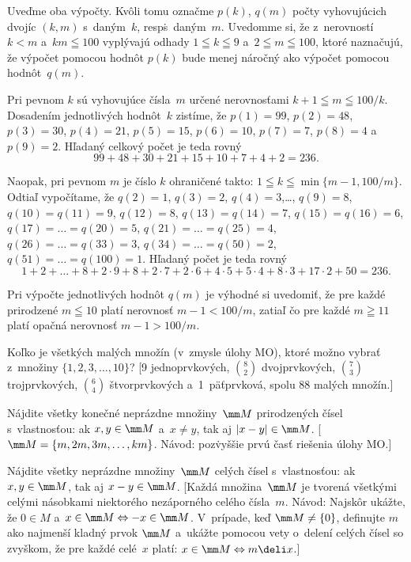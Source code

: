 {Uveďme oba výpočty. Kvôli tomu označme $p(k)$, $q(m)$ počty
vyhovujúcich dvojíc $(k,m)$ s~daným~$k$, resp\. s~daným~$m$.
Uvedomme si, že z~nerovností $k<m$ a~$km\leqq100$ vyplývajú odhady
$1\leqq k\leqq 9$ a~$2\leqq m\leqq 100$, ktoré naznačujú, že
výpočet pomocou hodnôt $p(k)$ bude menej náročný ako výpočet pomocou
hodnôt~$q(m)$.

Pri pevnom $k$ sú vyhovujúce čísla~$m$ určené nerovnosťami $k+1\leqq
m\leqq 100/k$. Dosadením jednotlivých hodnôt~$k$
zistíme, že $p(1)=99$, $p(2)=48$, $p(3)=30$, $p(4)=21$, $p(5)=15$,
$p(6)=10$, $p(7)=7$, $p(8)=4$ a~$p(9)=2$.
Hľadaný celkový počet je teda rovný
$$
99+48+30+21+15+10+7+4+2=236.
$$

Naopak, pri pevnom $m$ je číslo $k$ ohraničené takto:
$1\leqq k\leqq\min\{m-1,100/m\}$. Odtiaľ vypočítame,
že $q(2)=1$, $q(3)=2$, $q(4)=3$,\dots, $q(9)=8$,
$q(10)=q(11)=9$, $q(12)=8$, $q(13)=q(14)=7$,
$q(15)=q(16)=6$, $q(17)=\dots=q(20)=5$,
$q(21)=\dots=q(25)=4$, $q(26)=\dots=q(33)=3$,
$q(34)=\dots=q(50)=2$, $q(51)=\dots=q(100)=1$. Hľadaný počet
je teda rovný
$$
1+2+\dots+8+2\cdot9+8+2\cdot7+2\cdot6+4\cdot5+5\cdot4+8\cdot3+
17\cdot2+50=236.
$$

Pri výpočte jednotlivých hodnôt $q(m)$ je výhodné si uvedomiť, že
pre každé prirodzené $m\leqq10$ platí nerovnosť $m-1<100/m$,
zatiaľ čo pre každé $m\geqq11$ platí opačná nerovnosť
$m-1>100/m$.

Koľko je všetkých malých množín (v~zmysle úlohy MO), ktoré možno
vybrať z~množiny $\{1,2,3,\dots,10\}$? [9 jednoprvkových,
$\binom82$ dvojprvkových, $\binom73$ trojprvkových, $\binom64$
štvorprvkových a~1~päťprvková, spolu 88 malých množín.]

Nájdite všetky konečné neprázdne množiny~$\mm M$ prirodzených
čísel s~vlastnosťou: ak $x,y\in\mm M$ a~$x\ne y$, tak
aj $|x-y|\in\mm M$. [$\mm M=\{m,2m,3m,\dots,km\}$. Návod: poz\. vyššie
prvú časť riešenia úlohy MO.]

Nájdite všetky neprázdne množiny~$\mm M$ celých čísel
s~vlastnosťou: ak $x,y\in\mm M$, tak aj $x-y\in\mm M$. [Každá množina~$\mm M$
je tvorená všetkými celými násobkami niektorého nezáporného
celého čísla~$m$. Návod: Najskôr ukážte, že $0\in M$ a~$x\in\mm
M\Leftrightarrow {-x}\in\mm M$. V~prípade, keď $\mm M\ne \{0\}$,
definujte $m$ ako najmenší kladný prvok $\mm M$ a~ukážte pomocou
vety o~delení celých čísel so zvyškom, že pre každé celé~$x$
platí: $x\in\mm M\Leftrightarrow m\deli x$.]
}

